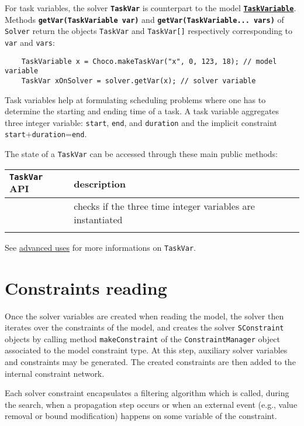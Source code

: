 For task variables, the solver \textbf{\tt TaskVar} is counterpart to the model \hyperlink{taskvariable}{\textbf{\tt TaskVariable}}. 
Methods \textbf{\tt getVar(TaskVariable var)} and \textbf{\tt getVar(TaskVariable... vars)} of \texttt{Solver} return the objects \texttt{TaskVar} and \texttt{TaskVar[]} respectively corresponding to \texttt{var} and \texttt{vars}:
\begin{lstlisting}
	TaskVariable x = Choco.makeTaskVar("x", 0, 123, 18); // model variable
	TaskVar xOnSolver = solver.getVar(x); // solver variable
\end{lstlisting}

Task variables help at formulating scheduling problems where one has to determine the starting and ending time of a task. A task variable aggregates three integer variable: \texttt{start}, \texttt{end}, and \texttt{duration} and the implicit constraint \texttt{start}+\texttt{duration}=\texttt{end}. 

The state of a \texttt{TaskVar} can be accessed through these main public methods:

\noindent\begin{tabular}{p{.3\linewidth}p{.7\linewidth}}
  \hline
  \texttt{TaskVar} API &  description \\
  \hline
	\mylst{isInstantiated()} &checks if the three time integer variables are instantiated\\
  \hline\\
\end{tabular}

\noindent See \hyperlink{advanced}{advanced uses} for more informations on \texttt{TaskVar}.

\section{Constraints reading}\label{solver:constraintsreading}\hypertarget{solver:constraintsreading}{}
Once the solver variables are created when reading the model, the solver then iterates over the constraints of the model, and creates the solver \texttt{SConstraint} objects  by calling method \texttt{makeConstraint} of the \texttt{ConstraintManager} object associated to the model constraint type.
At this step, auxiliary solver variables and constraints may be generated. The created constraints are then added to the internal constraint network. 

Each solver constraint encapsulates a filtering algorithm which is called, during the search, when a propagation step occurs or when an external event (e.g., value removal or bound modification) happens on some variable of the constraint.

